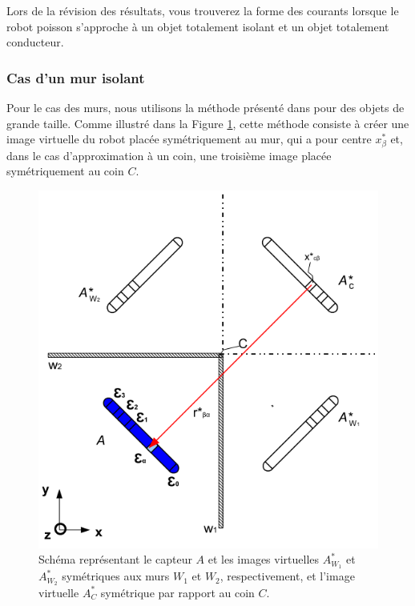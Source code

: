 Lors de la révision des résultats, vous trouverez la forme des courants lorsque le robot poisson s'approche à un objet totalement isolant et un objet totalement conducteur. 

\subsubsection{Cas d'un mur isolant}

Pour le cas des murs, nous utilisons la méthode présenté dans \cite{Jackson2012} pour des objets de grande taille. Comme illustré dans la Figure \ref{fig:schema_murs_coins}, cette méthode consiste à créer une image virtuelle du robot placée symétriquement au mur, qui a pour centre $x_\beta^*$ et, dans le cas d'approximation à un coin, une troisième image placée symétriquement au coin $C$. 

\begin{figure}[h!]
    \centering
    \includegraphics[scale=0.5]{doc/img/schema_murs_coins.png}
    \caption{Schéma représentant le capteur $A$ et les images virtuelles $A_{W_1}^*$ et $A_{W_2}^*$ symétriques aux murs $W_{1}$ et $W_{2}$, respectivement, et l'image virtuelle $A_C^*$ symétrique par rapport au coin $C$. }
    \label{fig:schema_murs_coins}
\end{figure}

